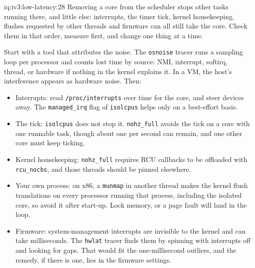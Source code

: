 \begin{solution}{iq:iv3:low-latency:28}
Removing a core from the scheduler stops other tasks running there, and little else: interrupts, the timer tick, kernel housekeeping, flushes requested by other threads and firmware can all still take the core. Check them in that order, measure first, and change one thing at a time.

Start with a tool that attributes the noise. The \texttt{osnoise} tracer runs a sampling loop per processor and counts lost time by source: NMI, interrupt, softirq, thread, or hardware if nothing in the kernel explains it. In a VM, the host's interference appears as hardware noise. Then:
\begin{itemize}
\item Interrupts: read \texttt{/proc/interrupts} over time for the core, and steer devices away. The \texttt{managed\_irq} flag of \texttt{isolcpus} helps only on a best-effort basis.
\item The tick: \texttt{isolcpus} does not stop it. \texttt{nohz\_full} avoids the tick on a core with one runnable task, though about one per second can remain, and one other core must keep ticking.
\item Kernel housekeeping: \texttt{nohz\_full} requires RCU callbacks to be offloaded with \texttt{rcu\_nocbs}, and those threads should be pinned elsewhere.
\item Your own process: on x86, a \texttt{munmap} in another thread makes the kernel flush translations on every processor running that process, including the isolated core, so avoid it after start-up. Lock memory, or a page fault will land in the loop.
\item Firmware: system-management interrupts are invisible to the kernel and can take milliseconds. The \texttt{hwlat} tracer finds them by spinning with interrupts off and looking for gaps. That would fit the one-millisecond outliers, and the remedy, if there is one, lies in the firmware settings.
\end{itemize}

\end{solution}

